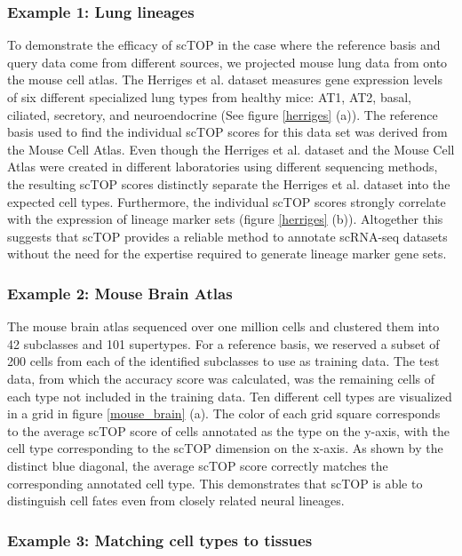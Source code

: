 \documentclass[vruler,JEB]{COB}%
\begin{document}
\subsubsection{Example 1: Lung lineages}
To demonstrate the efficacy of scTOP in the case where the reference basis and query data come from different sources, we projected mouse lung data from \cite{herriges_durable_2022} onto the mouse cell atlas. The Herriges et al. dataset measures gene expression levels of six different specialized lung types from healthy mice: AT1, AT2, basal, ciliated, secretory, and neuroendocrine (See figure \ref{herriges} (a)). The reference basis used to find the individual scTOP scores for this data set was derived from the Mouse Cell Atlas. Even though the Herriges et al. dataset and the Mouse Cell Atlas were created in different laboratories using different sequencing methods, the resulting scTOP scores distinctly separate the Herriges et al. dataset into the expected cell types. Furthermore, the individual scTOP scores strongly correlate with the expression of lineage marker sets (figure \ref{herriges} (b)).  Altogether this suggests that scTOP provides a reliable method to annotate scRNA-seq datasets without the need for the expertise required to generate lineage marker gene sets.

\subsubsection{Example 2: Mouse Brain Atlas}

The mouse brain atlas \citep{yao_taxonomy_2021} sequenced over one million cells and clustered them into 42 subclasses and 101 supertypes. For a reference basis, we reserved a subset of 200 cells from each of the identified subclasses to use as training data. The test data, from which the accuracy score was calculated, was the remaining cells of each type not included in the training data. Ten different cell types are visualized in a grid in figure \ref{mouse_brain} (a). The color of each grid square corresponds to the average scTOP score of cells annotated as the type on the y-axis, with the cell type corresponding to the scTOP dimension on the x-axis. As shown by the distinct blue diagonal, the average scTOP score correctly matches the corresponding annotated cell type. This demonstrates that scTOP is able to distinguish cell fates even from closely related neural lineages.

\subsubsection{Example 3: Matching cell types to tissues}
\end{document}
